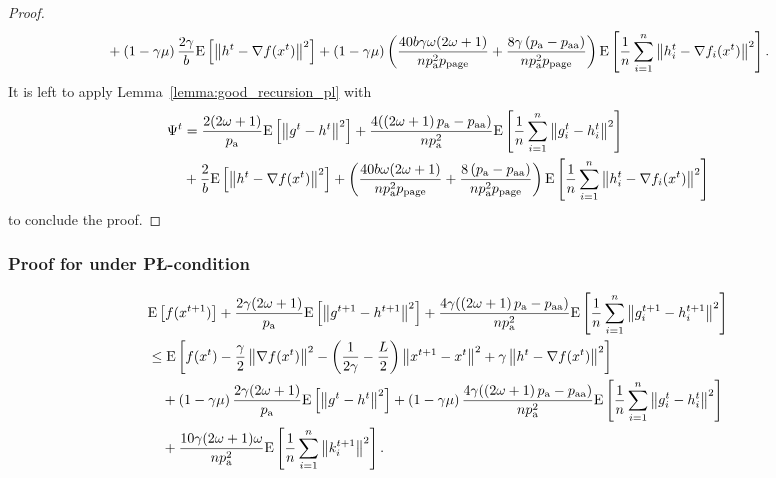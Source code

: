 \documentclass{article}
\newcommand{\algorithmname}{DARIA}
\newcommand*{\probavailable}{\ensuremath{p_{\textnormal{a}}}}
\newcommand*{\probpairaa}{\ensuremath{p_{\textnormal{aa}}}}
\newcommand*{\probpage}{\ensuremath{p_{\text{page}}}}
\begin{document}
\begin{proof}
\begin{align*}
      &\quad + \left(1 - \gamma \mu\right)\frac{2\gamma}{b}\Exp{\norm{h^{t} - \nabla f(x^{t})}^2} + \left(1 - \gamma \mu\right)\left(\frac{40 b \gamma \omega (2 \omega + 1)}{n \probavailable^2 \probpage} + \frac{8 \gamma \left(\probavailable - \probpairaa\right)}{n \probavailable^2 \probpage}\right)\Exp{\frac{1}{n}\sum_{i=1}^n\norm{h^{t}_i - \nabla f_i(x^{t})}^2}.
    \end{align*}
    It is left to apply Lemma~\ref{lemma:good_recursion_pl} with 
    \begin{align*}
      \Psi^t &= \frac{2 (2 \omega + 1)}{\probavailable} \Exp{\norm{g^{t} - h^{t}}^2} + \frac{4 (\left(2 \omega + 1\right)\probavailable - \probpairaa)}{n \probavailable^2} \Exp{\frac{1}{n}\sum_{i=1}^n\norm{g^{t}_i - h^{t}_i}^2} \\
      &+ \frac{2}{b}\Exp{\norm{h^{t} - \nabla f(x^{t})}^2} + \left(\frac{40 b \omega (2 \omega + 1)}{n \probavailable^2 \probpage} + \frac{8 \left(\probavailable - \probpairaa\right)}{n \probavailable^2 \probpage}\right)\Exp{\frac{1}{n}\sum_{i=1}^n\norm{h^{t}_i - \nabla f_i(x^{t})}^2}
    \end{align*}
    to conclude the proof.
  \end{proof}

  \subsubsection{Proof for \algname{\algorithmname-MVR} under P\L-condition}

  \CONVERGENCEPLSTOCHASTIC*

  \begin{align*}
    &\Exp{f(x^{t + 1})} + \frac{2\gamma (2\omega + 1)}{\probavailable} \Exp{\norm{g^{t+1} - h^{t+1}}^2} + \frac{4 \gamma (\left(2 \omega + 1\right)\probavailable - \probpairaa)}{n \probavailable^2} \Exp{\frac{1}{n}\sum_{i=1}^n\norm{g^{t+1}_i - h^{t+1}_i}^2}\\
    &\leq \Exp{f(x^t) - \frac{\gamma}{2}\norm{\nabla f(x^t)}^2 - \left(\frac{1}{2\gamma} - \frac{L}{2}\right)
    \norm{x^{t+1} - x^t}^2 + \gamma \norm{h^{t} - \nabla f(x^t)}^2}\nonumber\\
    &\quad + \left(1 - \gamma \mu\right)\frac{2\gamma(2\omega + 1)}{\probavailable}\Exp{\norm{g^{t} - h^t}^2} + \left(1 - \gamma \mu\right)\frac{4 \gamma (\left(2 \omega + 1\right)\probavailable - \probpairaa)}{n \probavailable^2}\Exp{\frac{1}{n} \sum_{i=1}^n\norm{g^t_i - h^{t}_i}^2}\nonumber\\
    &\quad + \frac{10 \gamma (2 \omega + 1)\omega}{n \probavailable^2}\Exp{\frac{1}{n} \sum_{i=1}^n\norm{k^{t+1}_i}^2}.
  \end{align*}
\end{document}
